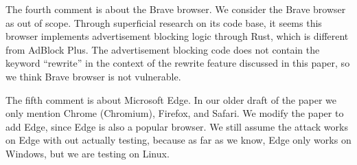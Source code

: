 \documentclass[conference]{IEEEtran}
\begin{document}
The fourth comment is about the Brave browser. We consider the Brave browser as out of scope. Through superficial research on its code base, it seems this browser implements advertisement blocking logic through Rust, which is different from AdBlock Plus. The advertisement blocking code does not contain the keyword ``rewrite'' in the context of the rewrite feature discussed in this paper, so we think Brave browser is not vulnerable.

The fifth comment is about Microsoft Edge. In our older draft of the paper we only mention Chrome (Chromium), Firefox, and Safari. We modify the paper to add Edge, since Edge is also a popular browser. We still assume the attack works on Edge with out actually testing, because as far as we know, Edge only works on Windows, but we are testing on Linux.
\end{document}
